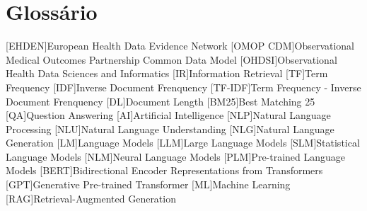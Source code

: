 


\chapter{Glossário}

\footnotesize
\SingleSpacing

\begin{multicols}{2}
\begin{acronym}[AAAAAA]

	[EHDEN]{European Health Data Evidence Network}
	[OMOP CDM]{Observational Medical Outcomes Partnership Common Data Model}
	[OHDSI]{Observational Health Data Sciences and Informatics}
	[IR]{Information Retrieval}
	[TF]{Term Frequency}
	[IDF]{Inverse Document Frenquency}
	[TF-IDF]{Term Frequency - Inverse Document Frenquency}
	[DL]{Document Length}
	[BM25]{Best Matching 25}
	[QA]{Question Answering}
	[AI]{Artificial Intelligence}
	[NLP]{Natural Language Processing}
	[NLU]{Natural Language Understanding}
	[NLG]{Natural Language Generation}
	[LM]{Language Models}
	[LLM]{Large Language Models}
	[SLM]{Statistical Language Models}
	[NLM]{Neural Language Models}
	[PLM]{Pre-trained Language Models}
	[BERT]{Bidirectional Encoder Representations from Transformers}
	[GPT]{Generative Pre-trained Transformer}
	[ML]{Machine Learning}
	[RAG]{Retrieval-Augmented Generation}

\end{acronym}
\end{multicols}


